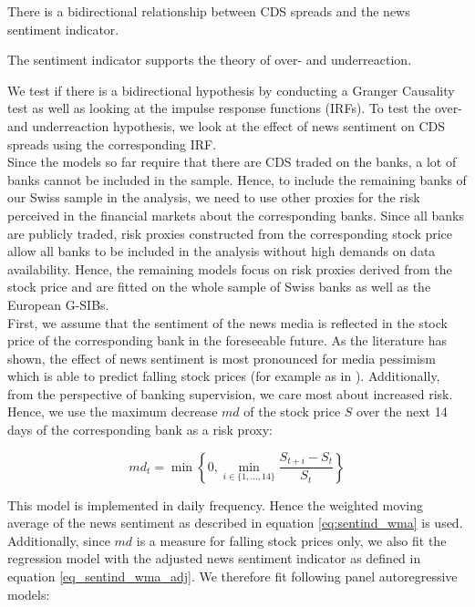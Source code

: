 \begin{hyp}
	There is a bidirectional relationship between CDS spreads and the news sentiment indicator.
\end{hyp}

\begin{hyp}
	The sentiment indicator supports the theory of over- and underreaction.
\end{hyp}

We test if there is a bidirectional hypothesis by conducting a Granger Causality test as well as looking at the impulse response functions (IRFs). To test the over- and underreaction hypothesis, we look at the effect of news sentiment on CDS spreads using the corresponding IRF. \\

Since the models so far require that there are CDS traded on the banks, a lot of banks cannot be included in the sample. Hence, to include the remaining banks of our Swiss sample in the analysis, we need to use other proxies for the risk perceived in the financial markets about the corresponding banks. Since all banks are publicly traded, risk proxies constructed from the corresponding stock price allow all banks to be included in the analysis without high demands on data availability. Hence, the remaining models focus on risk proxies derived from the stock price and are fitted on the whole sample of Swiss banks as well as the European G-SIBs. \\

First, we assume that the sentiment of the news media is reflected in the stock price of the corresponding bank in the foreseeable future. As the literature has shown, the effect of news sentiment is most pronounced for media pessimism which is able to predict falling stock prices (for example as in \cite{tetlock2007}). Additionally, from the perspective of banking supervision, we care most about increased risk. Hence, we use the maximum decrease $md$ of the stock price $S$ over the next 14 days of the corresponding bank as a risk proxy:

\begin{equation}
	md_t = \min\left\{ 0, \min_{i\in\{1,...,14\}} \frac{S_{t+i}-S_t}{S_t} \right\}
\end{equation}


 This model is implemented in daily frequency. Hence the weighted moving average of the news sentiment as described in equation \ref{eq:sentind_wma} is used. Additionally, since $md$ is a measure for falling stock prices only, we also fit the regression model with the adjusted news sentiment indicator as defined in equation \ref{eq_sentind_wma_adj}. We therefore fit following panel autoregressive models:

